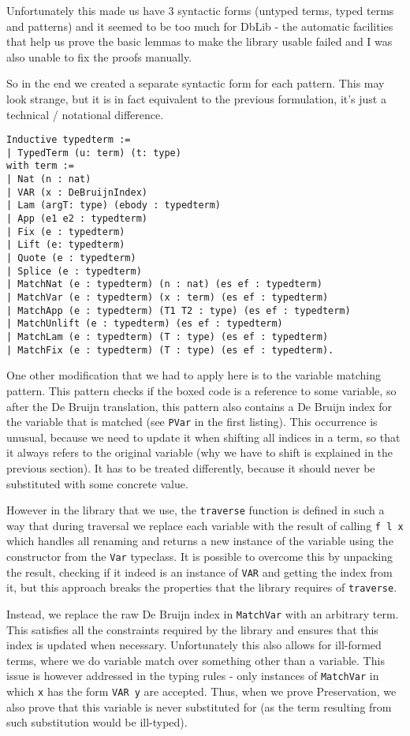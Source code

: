 \documentclass[runningheads]{article}
\begin{document}
Unfortunately this made us have 3 syntactic forms (untyped terms, typed terms and patterns) and it seemed to be too much for DbLib - the automatic facilities that help us prove the basic lemmas to make the library usable failed and I was also unable to fix the proofs manually.

So in the end we created a separate syntactic form for each pattern. This may look strange, but it is in fact equivalent to the previous formulation, it's just a technical / notational difference.

\begin{verbatim}
Inductive typedterm :=
| TypedTerm (u: term) (t: type)
with term :=
| Nat (n : nat)
| VAR (x : DeBruijnIndex)
| Lam (argT: type) (ebody : typedterm)
| App (e1 e2 : typedterm)
| Fix (e : typedterm)
| Lift (e: typedterm)
| Quote (e : typedterm)
| Splice (e : typedterm)
| MatchNat (e : typedterm) (n : nat) (es ef : typedterm)
| MatchVar (e : typedterm) (x : term) (es ef : typedterm)
| MatchApp (e : typedterm) (T1 T2 : type) (es ef : typedterm)
| MatchUnlift (e : typedterm) (es ef : typedterm)
| MatchLam (e : typedterm) (T : type) (es ef : typedterm)
| MatchFix (e : typedterm) (T : type) (es ef : typedterm).
\end{verbatim}

One other modification that we had to apply here is to the variable matching pattern. This pattern checks if the boxed code is a reference to some variable, so after the De Bruijn translation, this pattern also contains a De Bruijn index for the variable that is matched (see \texttt{PVar} in the first listing). This occurrence is unusual, because we need to update it when shifting all indices in a term, so that it always refers to the original variable (why we have to shift is explained in the previous section). It has to be treated differently, because it should never be substituted with some concrete value.

However in the library that we use, the \texttt{traverse} function is defined in such a way that during traversal we replace each variable with the result of calling \texttt{f l x} which handles all renaming and returns a new instance of the variable using the constructor from the \texttt{Var} typeclass. It is possible to overcome this by unpacking the result, checking if it indeed is an instance of \texttt{VAR} and getting the index from it, but this approach breaks the properties that the library requires of \texttt{traverse}.

Instead, we replace the raw De Bruijn index in \texttt{MatchVar} with an arbitrary term. This satisfies all the constraints required by the library and ensures that this index is updated when necessary. Unfortunately this also allows for ill-formed terms, where we do variable match over something other than a variable. This issue is however addressed in the typing rules - only instances of \texttt{MatchVar} in which \texttt{x} has the form \texttt{VAR y} are accepted. Thus, when we prove Preservation, we also prove that this variable is never substituted for (as the term resulting from such substitution would be ill-typed).
\end{document}
